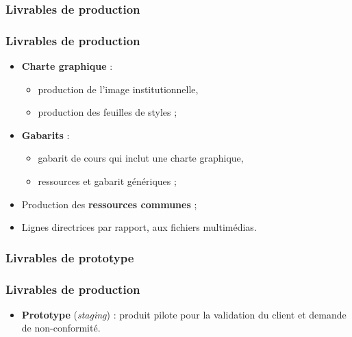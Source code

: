 					\subsubsection{Livrables de production} 
							\begin{frame}
							\frametitle{Livrables de production}
                        			
							\begin{itemize}
							\item \textbf{Charte graphique} :
								\begin{itemize}
								\item production de l’image institutionnelle,
								\item production des feuilles de styles ;
								\end{itemize}
							\item \textbf{Gabarits} :
								\begin{itemize}
								\item gabarit de cours qui inclut une charte graphique,
								\item ressources et gabarit génériques ;
								\end{itemize}
							\item Production des \textbf{ressources communes} ;
							\item Lignes directrices par rapport, aux fichiers multimédias.
						
							\end{itemize}						
					\end{frame}
					
						\subsubsection{Livrables de prototype} 
							\begin{frame}
							\frametitle{Livrables de production}
                        			
							\begin{itemize}
							\item \textbf{Prototype} (\textit{staging}) : produit pilote pour la validation du client et demande de non-conformité.
						
							\end{itemize}						
					\end{frame}
					
